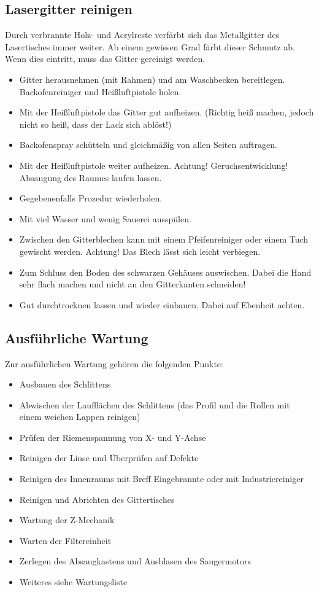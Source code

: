 \documentclass{\basedir/fablab-document}
\begin{document}
	\subsection{Lasergitter reinigen}
	Durch verbrannte Holz- und Acrylreste verfärbt sich das Metallgitter des Lasertisches immer weiter. Ab einem gewissen Grad färbt dieser Schmutz ab. Wenn dies eintritt, muss das Gitter gereinigt werden.
	\begin{itemize}
		\item Gitter herausnehmen (mit Rahmen) und am Waschbecken bereitlegen. Backofenreiniger und Heißluftpistole holen.
		\item Mit der Heißluftpistole das Gitter gut aufheizen. (Richtig heiß machen, jedoch nicht so heiß, dass der Lack sich ablöst!)
		\item Backofenspray schütteln und gleichmäßig von allen Seiten auftragen.
		\item Mit der Heißluftpistole weiter aufheizen. Achtung! Geruchsentwicklung! Absaugung des Raumes laufen lassen.
		\item Gegebenenfalls Prozedur wiederholen.
		\item Mit viel Wasser und wenig Sauerei ausspülen.
		\item Zwischen den Gitterblechen kann mit einem Pfeifenreiniger oder einem Tuch gewischt werden. Achtung! Das Blech lässt sich leicht verbiegen.
		\item Zum Schluss den Boden des schwarzen Gehäuses auswischen. Dabei die Hand sehr flach machen und nicht an den Gitterkanten schneiden!
		\item Gut durchtrocknen lassen und wieder einbauen. Dabei auf Ebenheit achten.
	\end{itemize}
	\subsection{Ausführliche Wartung}
	Zur ausführlichen Wartung gehören die folgenden Punkte:
	\begin{itemize}
		\item Ausbauen des Schlittens
		\item Abwischen der Laufflächen des Schlittens (das Profil und die Rollen mit einem weichen Lappen reinigen)
		\item Prüfen der Riemenspannung von X- und Y-Achse
		\item Reinigen der Linse und Überprüfen auf Defekte
		\item Reinigen des Innenraums mit Breff Eingebrannte oder mit Industriereiniger
		\item Reinigen und Abrichten des Gittertisches
		\item Wartung der Z-Mechanik
		\item Warten der Filtereinheit
		\item Zerlegen des Absaugkastens und Ausblasen des Saugermotors
		\item Weiteres siehe Wartungsliste
	\end{itemize}
\end{document}
